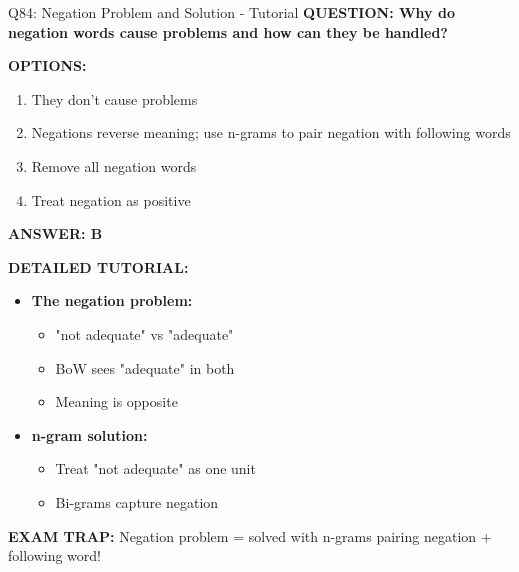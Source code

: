 \documentclass[8pt]{beamer}
\begin{document}
	\begin{frame}{Q84: Negation Problem and Solution - Tutorial}
		\fontsize{6.5}{7.5}\selectfont
		\textbf{QUESTION: Why do negation words cause problems and how can they be handled?}
		
		\vspace{0.1cm}
		\textbf{OPTIONS:}
		\begin{enumerate}
			\item They don't cause problems
			\item Negations reverse meaning; use n-grams to pair negation with following words
			\item Remove all negation words
			\item Treat negation as positive
		\end{enumerate}
		
		\vspace{0.1cm}
		\textcolor{myblue}{\textbf{ANSWER: B}}
		
		\vspace{0.1cm}
		\textbf{DETAILED TUTORIAL:}
		\begin{itemize}
			\item \textbf{The negation problem:}
			\begin{itemize}
				\item "not adequate" vs "adequate"
				\item BoW sees "adequate" in both
				\item Meaning is opposite
			\end{itemize}
			\item \textbf{n-gram solution:}
			\begin{itemize}
				\item Treat "not adequate" as one unit
				\item Bi-grams capture negation
			\end{itemize}
		\end{itemize}
		
		\textcolor{myred}{\textbf{EXAM TRAP:}} Negation problem = \textcolor{myblue}{solved with n-grams} pairing negation + following word!
	\end{frame}
	
\end{document}
